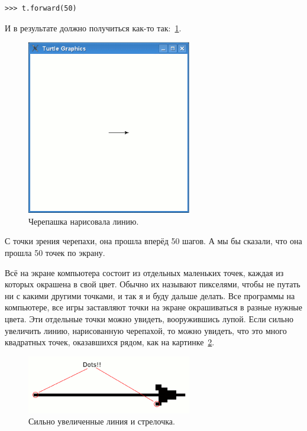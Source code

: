 \begin{listing}
\begin{verbatim}
>>> t.forward(50)
\end{verbatim}
\end{listing}

И в результате должно получиться как-то так:~\ref{fig11}.

\begin{figure}
\begin{center}
\includegraphics[width=72mm]{../en/figure11.eps}
\end{center}
\caption{Черепашка нарисовала линию.}\label{fig11}
\end{figure}

С точки зрения черепахи, она прошла вперёд 50 шагов. А мы бы сказали, что она прошла 50 точек по экрану.


Всё на экране компьютера состоит из отдельных маленьких точек, каждая из которых окрашена в свой цвет. Обычно их называют пикселями, чтобы не путать ни с какими другими точками, и так я и буду дальше делать. Все программы на компьютере, все игры заставляют точки на экране окрашиваться в разные нужные цвета. Эти отдельные точки можно увидеть, вооружившись лупой. Если сильно увеличить линию, нарисованную черепахой, то можно увидеть, что это много квадратных точек, оказавшихся рядом, как на картинке \ref{fig12}.

\begin{figure}
\begin{center}
\includegraphics[width=72mm]{../en/figure12.eps}
\end{center}
\caption{Сильно увеличенные линия и стрелочка.}\label{fig12}
\end{figure}

